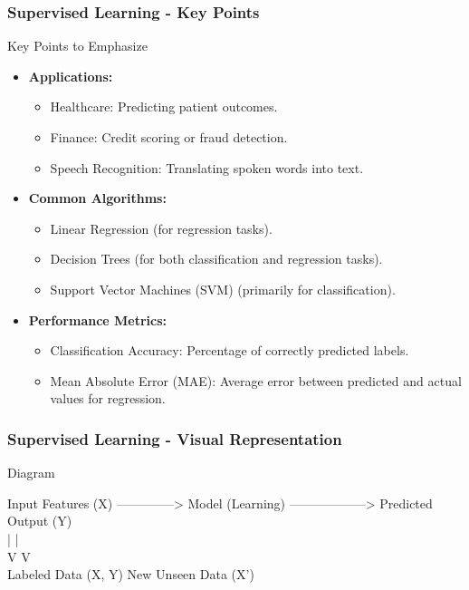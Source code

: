 \documentclass[aspectratio=169]{beamer}
\begin{document}
\begin{frame}[fragile]
    \frametitle{Supervised Learning - Key Points}
    \begin{block}{Key Points to Emphasize}
        \begin{itemize}
            \item \textbf{Applications:}
                \begin{itemize}
                    \item Healthcare: Predicting patient outcomes.
                    \item Finance: Credit scoring or fraud detection.
                    \item Speech Recognition: Translating spoken words into text.
                \end{itemize}
            \item \textbf{Common Algorithms:}
                \begin{itemize}
                    \item Linear Regression (for regression tasks).
                    \item Decision Trees (for both classification and regression tasks).
                    \item Support Vector Machines (SVM) (primarily for classification).
                \end{itemize}
            \item \textbf{Performance Metrics:}
                \begin{itemize}
                    \item Classification Accuracy: Percentage of correctly predicted labels.
                    \item Mean Absolute Error (MAE): Average error between predicted and actual values for regression.
                \end{itemize}
        \end{itemize}
    \end{block}
\end{frame}

\begin{frame}[fragile]
    \frametitle{Supervised Learning - Visual Representation}
    \begin{block}{Diagram}
        \begin{center}
        \large
        Input Features (X) --------------> Model (Learning) ------------------> Predicted Output (Y) \\ 
               |                                                  | \\
               V                                                  V \\
          Labeled Data (X, Y)                              New Unseen Data (X') 
        \end{center}
    \end{block}
\end{frame}
\end{document}
